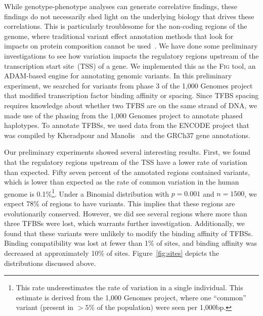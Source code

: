 \documentclass[11pt]{article} %
\begin{document}
While genotype-phenotype analyses can generate correlative findings, these findings do not
necessarily shed light on the underlying biology that drives these correlations. This is
particularly troublesome for the non-coding regions of the genome, where traditional variant
effect annotation methods that look for impacts on protein composition cannot be
used~\cite{mclaren10}. We have done some preliminary investigations to see how variation impacts
the regulatory regions upstream of the transcription start site~(TSS) of a gene. We implemented
this as the \textsc{Fig} tool, an \textsc{ADAM}-based engine for annotating
genomic variants. In this preliminary experiment, we searched for variants from phase 3 of the
1,000 Genomes project that modified transcription factor binding affinity or spacing. Since
TFBS spacing requires knowledge about whether two TFBS are
on the same strand of DNA, we made use of the phasing from the 1,000 Genomes project to annotate
phased haplotypes. To annotate TFBSs, we used data from the ENCODE project that was compiled by
Kheradpour and Manolis~\cite{kheradpour14} and the GRCh37 gene annotations.

Our preliminary experiments showed several interesting results. First, we found that the regulatory
regions upstream of the TSS have a lower rate of variation than expected. Fifty seven percent of the annotated
regions contained variants, which is lower than expected as the rate of common variation
in the human genome is 0.1\%\footnote{This rate underestimates the rate of variation in a single
individual. This estimate is derived from the 1,000 Genomes project, where one ``common'' variant
(present in $>5\%$ of the population) were seen per 1,000bp.}. Under a Binomial distribution with
$p = 0.001$ and $n = 1500$, we expect 78\% of regions to have variants. This implies that
these regions are evolutionarily conserved. However, we did see several regions where more than
three TFBSs were lost, which warrants further investigation. Additionally, we found that these
variants were unlikely to modify the binding affinity of TFBSs. Binding compatibility was lost at
fewer than 1\% of sites, and binding affinity was decreased at approximately 10\% of sites.
Figure~\ref{fig:sites} depicts the distributions discussed above.
\end{document}
